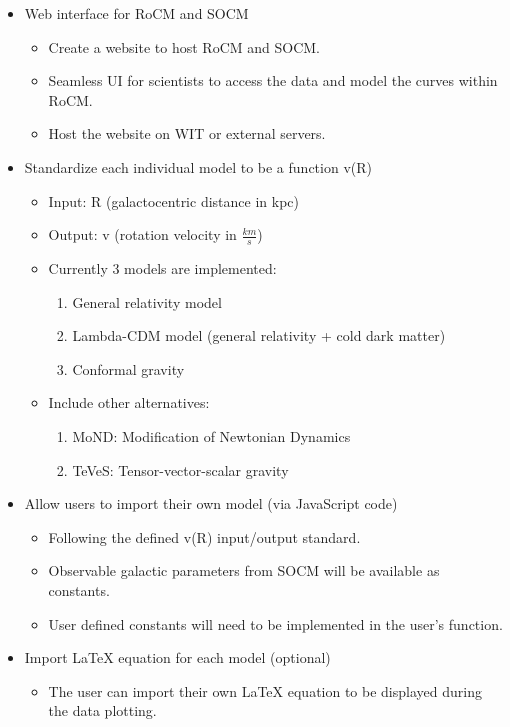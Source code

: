 \documentclass[12pt]{article}
\begin{document}
\begin{itemize}
	\item Web interface for RoCM and SOCM
	\begin{itemize}
		\item Create a website to host RoCM and SOCM. 
		\item Seamless UI for scientists to access the data and model the curves within RoCM.
		\item Host the website on WIT or external servers.
	\end{itemize}
	\item Standardize each individual model to be a function v(R)
	\begin{itemize}
		\item Input: R (galactocentric distance in kpc)
		\item Output: v (rotation velocity in $\frac{km}{s}$)
		\item Currently 3 models are implemented:
		\begin{enumerate}
			\item General relativity model
			\item Lambda-CDM model (general relativity + cold dark matter)
			\item Conformal gravity
		\end{enumerate}
		\item Include other alternatives:
		\begin{enumerate}
			\item MoND: Modification of Newtonian Dynamics
			\item TeVeS: Tensor-vector-scalar gravity
		\end{enumerate}
	\end{itemize}
	\item Allow users to import their own model (via JavaScript code)
	\begin{itemize}
		\item Following the defined v(R) input/output standard.
		\item Observable galactic parameters from SOCM will be available as constants.
		\item User defined constants will need to be implemented in the user's function.
	\end{itemize}
	\item Import LaTeX equation for each model (optional)
	\begin{itemize}
		\item The user can import their own LaTeX equation to be displayed during the data plotting.

\end{itemize}
\end{itemize}
\end{document}
